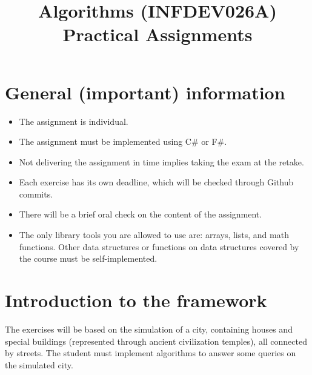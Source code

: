 \documentclass[10pt,a4paper]{article}
\title{Algorithms (INFDEV026A) \\ Practical Assignments}
\author { }
\date { }
\begin{document}
\maketitle

\section*{General (important) information}
\begin{itemize}[noitemsep]
\item The assignment is individual.
\item The assignment must be implemented using C\# or F\#.
\item Not delivering the assignment in time implies taking the exam at the retake.
\item Each exercise has its own deadline, which will be checked through Github commits.
\item There will be a brief oral check on the content of the assignment.
\item The only library tools you are allowed to use are: arrays, lists, and math functions. Other data structures or functions on data structures covered by the course must be self-implemented.
\end{itemize}

\section*{Introduction to the framework}
The exercises will be based on the simulation of a city, containing houses and special buildings (represented through ancient civilization temples), all connected by streets. The student must implement algorithms to answer some queries on the simulated city.
\end{document}
